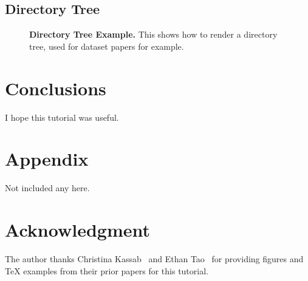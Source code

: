 \documentclass[letterpaper, 10 pt, conference]{ieeeconf}  %
\begin{document}
{\color{gray}{\lipsum[1-3]}}

\subsection{Directory Tree}
{\color{gray}{\lipsum[1]}}

\begin{figure}[t]
    \centering
    
    \caption{\textbf{Directory Tree Example.} This shows how to render a directory tree, used for dataset papers for example.}
    \label{fig:dir-tree}
\end{figure}

{\color{gray}{\lipsum[1-3]}}


\section{Conclusions}

I hope this tutorial was useful.


\section*{Appendix}

Not included any here.

\section*{Acknowledgment}

The author thanks Christina Kassab~\cite{kassab2025ol3d} and Ethan Tao~\cite{tao2022pdc} for providing figures and TeX examples from their prior papers for this tutorial.



\balance



\end{document}
